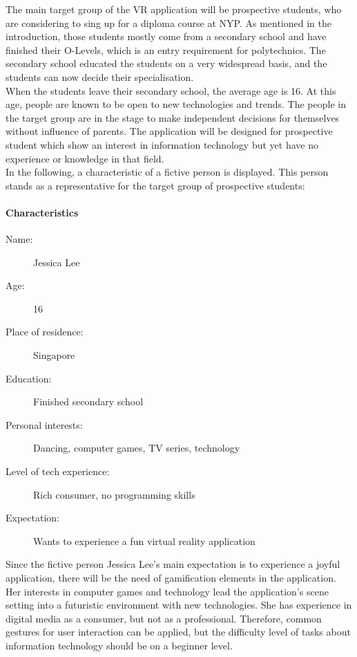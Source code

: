 The main target group of the VR application will be prospective students, who are considering to sing up for a diploma course at NYP. As mentioned in the introduction, those students mostly come from a secondary school and have finished their O-Levels, which is an entry requirement for polytechnics. The secondary school educated the students on a very widespread basis, and the students can now decide their specialisation. \\
When the students leave their secondary school, the average age is 16. At this age, people are known to be open to new technologies and trends. The people in the target group are in the stage to make independent decisions for themselves without influence of parents. The application will be designed for prospective student which show an interest in information technology but yet have no experience or knowledge in that field.\\
In the following, a characteristic of a fictive person is displayed. This person stands as a representative for the target group of prospective students:

\paragraph{Characteristics}
\begin{description}
	\item[Name:] Jessica Lee
	\item[Age:] 16
	\item[Place of residence:] Singapore
	\item[Education:] Finished secondary school
	\item[Personal interests:] Dancing, computer games, TV series, technology
	\item[Level of tech experience:] Rich consumer, no programming skills
	\item[Expectation:] Wants to experience a fun virtual reality application
\end{description}
Since the fictive person Jessica Lee's main expectation is to experience a joyful application, there will be the need of gamification elements in the application. Her interests in computer games and technology lead the application's scene setting into a futuristic environment with new technologies. She has experience in digital media as a consumer, but not as a professional. Therefore, common gestures for user interaction can be applied, but the difficulty level of tasks about information technology should be on a beginner level. 
